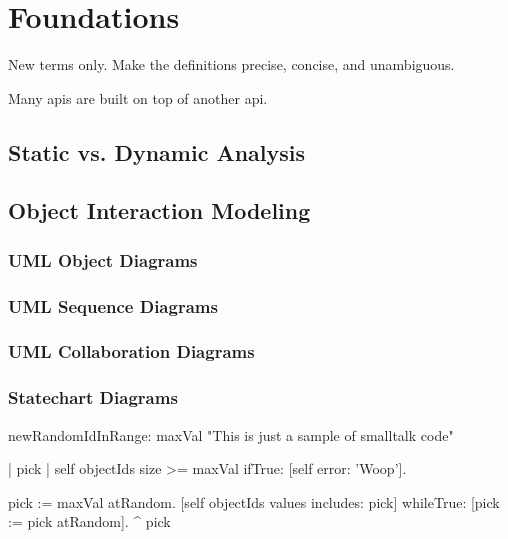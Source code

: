 \chapter{Foundations}
\label{c:Foundations}

New terms only. Make the definitions precise, concise, and unambiguous.

Many \acp{api} are built on top of another \ac{api}.

\section{Static vs. Dynamic Analysis}

\section{Object Interaction Modeling}
\subsection{UML Object Diagrams}
\subsection{UML Sequence Diagrams}
\subsection{UML Collaboration Diagrams}
\subsection{Statechart Diagrams}

\begin{smalltalk}[float=htbp,caption=Smalltalk Sample]
newRandomIdInRange: maxVal
	"This is just a sample of smalltalk code"
	
	| pick |
	self objectIds size >= maxVal ifTrue: [self error: 'Woop'].
	
	pick := maxVal atRandom.
	[self objectIds values includes: pick] 
		whileTrue: [pick := pick atRandom].
	^  pick
\end{smalltalk}

